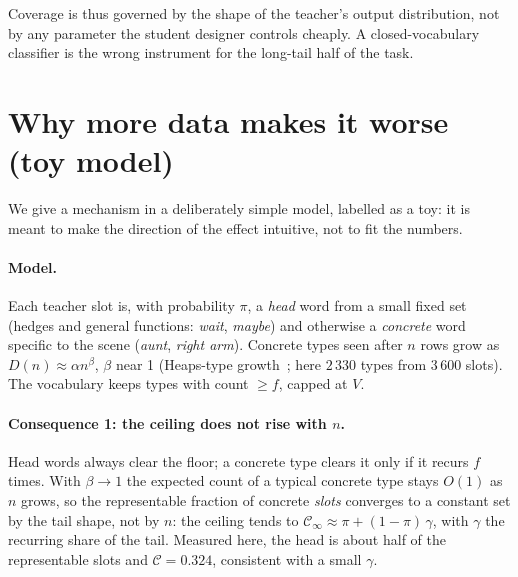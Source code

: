 \documentclass{article}
\newcommand{\covv}{\mathcal{C}}
\begin{document}
Coverage is thus governed by the shape of the teacher's output distribution,
not by any parameter the student designer controls cheaply. A closed-vocabulary
classifier is the wrong instrument for the long-tail half of the task.

\section{Why more data makes it worse (toy model)}
\label{sec:model}
We give a mechanism in a deliberately simple model, labelled as a toy: it is
meant to make the direction of the effect intuitive, not to fit the numbers.

\paragraph{Model.} Each teacher slot is, with probability $\pi$, a
\emph{head} word from a small fixed set (hedges and general functions:
\emph{wait}, \emph{maybe}) and otherwise a \emph{concrete} word specific to the
scene (\emph{aunt}, \emph{right arm}). Concrete types seen after $n$ rows grow
as $D(n)\approx\alpha n^{\beta}$, $\beta$ near 1 (Heaps-type
growth~\citep{heaps1978}; here $2\,330$ types from $3\,600$ slots). The
vocabulary keeps types with count $\ge f$, capped at $V$.

\paragraph{Consequence 1: the ceiling does not rise with $n$.} Head words
always clear the floor; a concrete type clears it only if it recurs $f$ times.
With $\beta\to1$ the expected count of a typical concrete type stays $O(1)$ as
$n$ grows, so the representable fraction of concrete \emph{slots} converges to
a constant set by the tail shape, not by $n$: the ceiling tends to
$\covv_\infty\approx\pi+(1-\pi)\,\gamma$, with $\gamma$ the recurring share of
the tail. Measured here, the head is about half of the representable slots and
$\covv=0.324$, consistent with a small $\gamma$.
\end{document}
